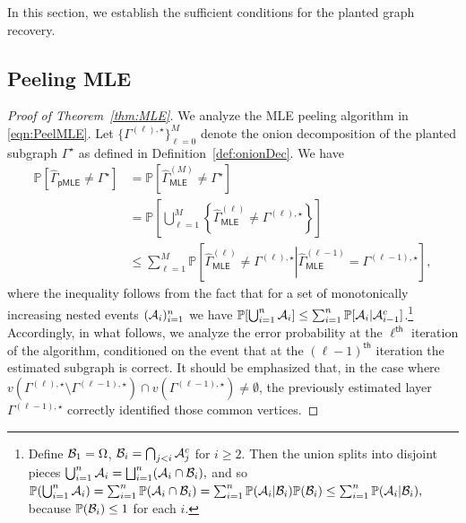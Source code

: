 \documentclass[12pt]{article}
\newcommand {\pr} {\mathbb{P}}
\newcommand{\calA}{{\cal A}}
\newcommand{\calB}{{\cal B}}
\newcommand{\pp}[1]{\left[#1\right]}
\newcommand{\ppp}[1]{\left\{#1\right\}}
\newcommand{\s}[1]{\mathsf{#1}}
\begin{document}
In this section, we establish the sufficient conditions for the planted graph recovery.


\subsection{Peeling MLE}\label{sec:upperbounds_MLE}
\begin{proof}[Proof of Theorem~\ref{thm:MLE}]
We analyze the MLE peeling algorithm in \eqref{eqn:PeelMLE}. Let $\{\Gamma^{(\ell),\star}\}_{\ell=0}^M$ denote the onion decomposition of the planted subgraph $\Gamma^\star$ as defined in Definition~\ref{def:onionDec}. We have
\begin{align}
    \pr[\hat{\Gamma}_{\s{pMLE}}\neq\Gamma^{\star}] &= \pr[\hat{\Gamma}^{(M)}_{\s{MLE}}\neq\Gamma^{\star}]\\
    & = \pr\pp{\bigcup_{\ell=1}^M\ppp{\hat{\Gamma}^{(\ell)}_{\s{MLE}}\neq{\Gamma}^{(\ell),\star}}}\\
    & \leq \sum_{\ell=1}^M\pr\pp{\left.\hat{\Gamma}^{(\ell)}_{\s{MLE}}\neq{\Gamma}^{(\ell),\star}\right|\hat{\Gamma}^{(\ell-1)}_{\s{MLE}}={\Gamma}^{(\ell-1),\star}},\label{eqn:UnionSmartBound}
\end{align}
where the inequality follows from the fact that for a set of monotonically increasing nested events $(\calA_i)_{i=1}^n$ we have $\pr[\bigcup_{i=1}^n\calA_i]\leq\sum_{i=1}^n\pr[\calA_i\vert \calA_{i-1}^c]$.\footnote{Define $\calB_1 = \Omega$, $\calB_i = \bigcap_{j < i} \calA_j^{c}$ for $i \geq2$. Then the union splits into disjoint pieces $\bigcup_{i=1}^n \calA_i=\bigsqcup_{i=1}^n (\calA_i \cap \calB_i),$ and so $\pr(\bigcup_{i=1}^n \calA_i) = \sum_{i=1}^n \pr(\calA_i \cap \calB_i)= \sum_{i=1}^n \pr(\calA_i \vert \calB_i)\pr(\calB_i)\leq\sum_{i=1}^n \pr(\calA_i\vert \calB_i),$ because $\pr(\calB_i) \leq 1$ for each $i$.} Accordingly, in what follows, we analyze the error probability at the $\ell^{\s{th}}$ iteration of the algorithm, conditioned on the event that at the $(\ell-1)^{\s{th}}$ iteration the estimated subgraph is correct. It should be emphasized that, in the case where $v({\Gamma}^{(\ell),\star}\setminus{\Gamma}^{(\ell-1),\star})\cap v({\Gamma}^{(\ell-1),\star})\neq\emptyset$, the previously estimated layer ${\Gamma}^{(\ell-1),\star}$ correctly identified those common vertices. 


\end{proof}
\end{document}
